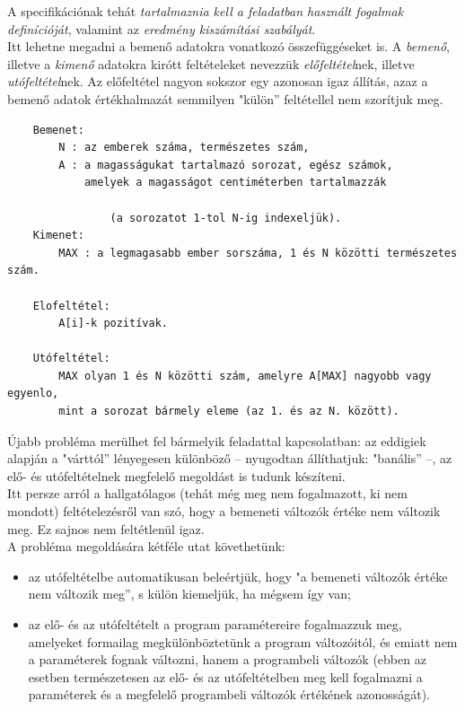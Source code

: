 \documentclass[12pt,margin=0px]{article}
\begin{document}
    \noindent A specifikációnak tehát \emph{tartalmaznia kell a feladatban használt fogalmak definícióját}, valamint az \emph{eredmény kiszámítási szabályát}.\\

    \noindent Itt lehetne megadni a bemenő adatokra vonatkozó összefüggéseket is. A \emph{bemenő}, illetve a \emph{kimenő} adatokra kirótt feltételeket nevezzük \emph{előfeltétel}nek, illetve \emph{utófeltétel}nek. Az előfeltétel nagyon sokszor egy azonosan igaz állítás, azaz a bemenő adatok értékhalmazát semmilyen "külön” feltétellel nem szorítjuk meg.
	
	\begin{verbatim}
	Bemenet:
     	N : az emberek száma, természetes szám,
     	A : a magasságukat tartalmazó sorozat, egész számok,
        	amelyek a magasságot centiméterben tartalmazzák

                (a sorozatot 1-tol N-ig indexeljük).
	Kimenet:	
     	MAX : a legmagasabb ember sorszáma, 1 és N közötti természetes szám.
	
	Elofeltétel:
    	A[i]-k pozitívak.
	
	Utófeltétel: 	
	    MAX olyan 1 és N közötti szám, amelyre A[MAX] nagyobb vagy egyenlo, 	
	    mint a sorozat bármely eleme (az 1. és az N. között).
	\end{verbatim}
	
    \noindent Újabb probléma merülhet fel bármelyik feladattal kapcsolatban: az eddigiek alapján a "várttól” lényegesen különböző – nyugodtan állíthatjuk: "banális” –, az elő- és utófeltételnek megfelelő megoldást is tudunk készíteni.\\
	
    \noindent Itt persze arról a hallgatólagos (tehát még meg nem fogalmazott, ki nem mondott) feltételezésről van szó, hogy a bemeneti változók értéke nem változik meg. Ez sajnos nem feltétlenül igaz.\\

    \noindent A probléma megoldására kétféle utat követhetünk:
	\begin{itemize}
		\item az utófeltételbe automatikusan beleértjük, hogy "a bemeneti változók értéke nem változik meg”, s külön kiemeljük, ha mégsem így van;
        \item az elő- és az utófeltételt a program paramétereire fogalmazzuk meg, amelyeket formailag megkülönböztetünk a program változóitól, és emiatt nem a paraméterek fognak változni, hanem a programbeli változók (ebben az esetben természetesen az elő- és az utófeltételben meg kell fogalmazni a paraméterek és a megfelelő programbeli változók értékének azonosságát).
	\end{itemize}
\end{document}
